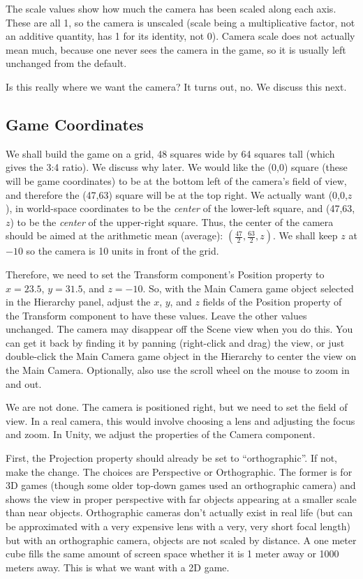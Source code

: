\documentclass[12pt]{amsbook}
\theoremstyle{definition}
\theoremstyle{remark}
\numberwithin{figure}{chapter}
\numberwithin{table}{chapter}
\numberwithin{section}{chapter}
\numberwithin{equation}{section}
\begin{document}
The scale values show how much the camera has been scaled along each axis.  These are all 1, so the camera is unscaled (scale being a multiplicative factor, not an additive quantity, has 1 for its identity, not 0).  Camera scale does not actually mean much, because one never sees the camera in the game, so it is usually left unchanged from the default.

Is this really where we want the camera? It turns out, no.  We discuss this next.

\subsection{Game Coordinates}

We shall build the game on a grid, 48 squares wide by 64 squares tall (which gives the 3:4 ratio).  We discuss why later.  We would like the (0,0) square (these will be game coordinates) to be at the bottom left of the camera's field of view, and therefore the (47,63) square will be at the top right.  We actually want (0,0,$z$), in world-space coordinates to be the \emph{center} of the lower-left square, and (47,63,$z$) to be the \emph{center} of the upper-right square.  Thus, the center of the camera should be aimed at the arithmetic mean (average): $(\frac{47}{2}, \frac{63}{2}, z)$.  We shall keep $z$ at $-10$ so the camera is 10 units in front of the grid.

Therefore, we need to set the Transform component's Position property to $x=23.5$, $y=31.5$, and $z=-10$.  So, with the Main Camera game object selected in the Hierarchy panel, adjust the $x$, $y$, and $z$ fields of the Position property of the Transform component to have these values.  Leave the other values unchanged.  The camera may disappear off the Scene view when you do this.  You can get it back by finding it by panning (right-click and drag) the view, or just double-click the Main Camera game object in the Hierarchy to center the view on the Main Camera.  Optionally, also use the scroll wheel on the mouse to zoom in and out.

We are not done.  The camera is positioned right, but we need to set the field of view.  In a real camera, this would involve choosing a lens and adjusting the focus and zoom.  In Unity, we adjust the properties of the Camera component.

First, the Projection property should already be set to ``orthographic''.  If not, make the change.  The choices are Perspective or Orthographic.  The former is for 3D games (though some older top-down games used an orthographic camera) and shows the view in proper perspective with far objects appearing at a smaller scale than near objects.  Orthographic cameras don't actually exist in real life (but can be approximated with a very expensive lens with a very, very short focal length) but with an orthographic camera, objects are not scaled by distance.  A one meter cube fills the same amount of screen space whether it is 1 meter away or 1000 meters away.  This is what we want with a 2D game.
\end{document}
